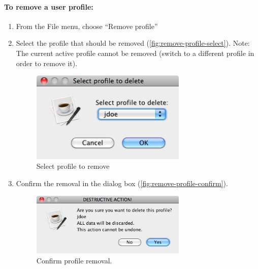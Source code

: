 \paragraph{To remove a user profile:}
\begin{enumerate}
  \item From the File menu, choose ``Remove profile''
  \item Select the profile that should be removed (\autoref{fig:remove-profile-select}).
  Note: The current active profile cannot be removed (switch to a different profile in order to remove it).
  
  
  \begin{figure}
  \centering
    \includegraphics[width=0.7\textwidth]{images/remove-profile-select.png}
  \caption{Select profile to remove}
  \label{fig:remove-profile-select}
\end{figure}
  
  \item Confirm the removal in the dialog box (\autoref{fig:remove-profile-confirm}).
  \begin{figure}
  \centering
    \includegraphics[width=0.7\textwidth]{images/remove-profile-confirm.png}
  \caption{Confirm profile removal.}
  \label{fig:remove-profile-confirm}
\end{figure}

\end{enumerate}

